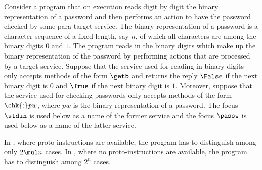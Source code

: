 \documentclass[fleqn]{llncs}
\begin{document}
\begin{example}
\label{example-password-1}
Consider a program that on execution reads digit by digit the binary
representation of a password and then performs an action to have the
password checked by some para-target service.
The binary representation of a password is a character sequence of a
fixed length, say $n$, of which all characters are among the binary
digits $0$ and $1$.
The program reads in the binary digits which make up the binary
representation of the password by performing actions that are processed
by a target service.
Suppose that the service used for reading in binary digits only accepts
methods of the form $\getb$ and returns the reply $\False$ if the next
binary digit is $0$ and $\True$ if the next binary digit is $1$.
Moreover, suppose that the service used for checking passwords only
accepts methods of the form $\chk{:}\mathit{pw}$, where $\mathit{pw}$ is
the binary representation of a password.
The focus $\stdin$ is used below as a name of the former service and
the focus $\passw$ is used below as a name of the latter service.

In \PGLDdii, where proto-instructions are available, the program has to
distinguish among only $2 \mul n$ cases.
In \PGLD, where no proto-instructions are available, the program has
to distinguish among $2^n$ cases.


\end{example}
\end{document}
